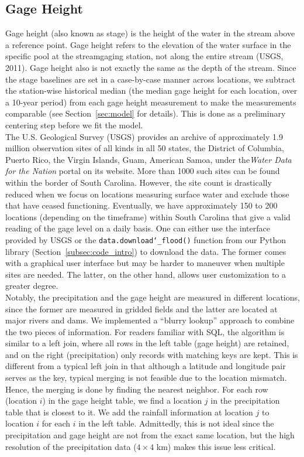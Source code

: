 \subsection{Gage Height}\label{subsec:gage-height}
Gage height (also known as stage) is the height of the water in the stream above a reference point.
Gage height refers to the elevation of the water surface in the specific pool at the streamgaging station, not along the entire stream (USGS, 2011).
Gage height also is not exactly the same as the depth of the stream.
Since the stage baselines are set in a case-by-case manner across locations, we subtract the station-wise historical median (the median gage height for each location, over a 10-year period) from each gage height measurement to make the measurements comparable (see Section~\ref{sec:model}  for details).
This is done as a preliminary centering step before we fit the model.\\

The U.S. Geological Survey (USGS) provides an archive of approximately 1.9 million observation sites of all kinds in all 50 states,  the District of Columbia, Puerto Rico, the Virgin Islands, Guam, American Samoa, under the\emph{Water Data for the Nation} portal on its website.
More than 1000 such sites can be found within the border of South Carolina. However, the site count is drastically reduced when we focus on locations measuring surface water and exclude those that have ceased functioning. Eventually, we have approximately 150 to 200 locations (depending on the timeframe) within South Carolina that give a valid reading of the gage level on a daily basis. One can either use the interface provided by USGS or the \texttt{data.download\char`_flood()} function from our Python library (Section~\ref{subsec:code_intro}) to download the data. The former comes with a graphical user interface but may be harder to maneuver when multiple sites are needed. The latter, on the other hand, allows user customization to a greater degree. \\

Notably, the precipitation and the gage height are measured in different locations, since the former are measured  in gridded fields and the latter are located at major rivers and dams. We implemented a ``blurry lookup''  approach to  combine the two pieces of information. For readers familiar with SQL, the algorithm is similar to a left join, where all rows in the left table (gage height) are retained, and on the right (precipitation) only records with  matching keys are kept. This is different from a typical left join in that although a latitude and longitude pair serves as the key, typical merging is not feasible due to the location mismatch. Hence, the merging is done by finding  the nearest neighbor. For each row (location $ i$) in the gage height table, we find a location $ j$ in the precipitation table that is closest to it. We add the rainfall information at location $ j$ to location $ i$ for each $ i$ in the left table. Admittedly, this is not ideal since the precipitation and gage height are not from the exact same location, but the high resolution of the precipitation data ($ 4 \times 4 $ km) makes this issue less critical.\\

